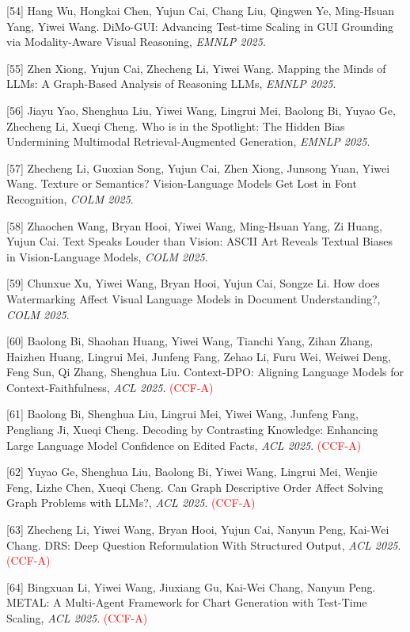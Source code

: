 [54] Hang Wu, Hongkai Chen, Yujun Cai, Chang Liu, Qingwen Ye, Ming-Hsuan Yang, Yiwei Wang. DiMo-GUI: Advancing Test-time Scaling in GUI Grounding via Modality-Aware Visual Reasoning, \textit{EMNLP 2025}.

[55] Zhen Xiong, Yujun Cai, Zhecheng Li, Yiwei Wang. Mapping the Minds of LLMs: A Graph-Based Analysis of Reasoning LLMs, \textit{EMNLP 2025}.

[56] Jiayu Yao, Shenghua Liu, Yiwei Wang, Lingrui Mei, Baolong Bi, Yuyao Ge, Zhecheng Li, Xueqi Cheng. Who is in the Spotlight: The Hidden Bias Undermining Multimodal Retrieval-Augmented Generation, \textit{EMNLP 2025}.

[57] Zhecheng Li, Guoxian Song, Yujun Cai, Zhen Xiong, Junsong Yuan, Yiwei Wang. Texture or Semantics? Vision-Language Models Get Lost in Font Recognition, \textit{COLM 2025}.

[58] Zhaochen Wang, Bryan Hooi, Yiwei Wang, Ming-Hsuan Yang, Zi Huang, Yujun Cai. Text Speaks Louder than Vision: ASCII Art Reveals Textual Biases in Vision-Language Models, \textit{COLM 2025}.

[59] Chunxue Xu, Yiwei Wang, Bryan Hooi, Yujun Cai, Songze Li. How does Watermarking Affect Visual Language Models in Document Understanding?, \textit{COLM 2025}.

[60] Baolong Bi, Shaohan Huang, Yiwei Wang, Tianchi Yang, Zihan Zhang, Haizhen Huang, Lingrui Mei, Junfeng Fang, Zehao Li, Furu Wei, Weiwei Deng, Feng Sun, Qi Zhang, Shenghua Liu. Context-DPO: Aligning Language Models for Context-Faithfulness, \textit{ACL 2025}. \textcolor{red}{(CCF-A)}

[61] Baolong Bi, Shenghua Liu, Lingrui Mei, Yiwei Wang, Junfeng Fang, Pengliang Ji, Xueqi Cheng. Decoding by Contrasting Knowledge: Enhancing Large Language Model Confidence on Edited Facts, \textit{ACL 2025}. \textcolor{red}{(CCF-A)}

[62] Yuyao Ge, Shenghua Liu, Baolong Bi, Yiwei Wang, Lingrui Mei, Wenjie Feng, Lizhe Chen, Xueqi Cheng. Can Graph Descriptive Order Affect Solving Graph Problems with LLMs?, \textit{ACL 2025}. \textcolor{red}{(CCF-A)}

[63] Zhecheng Li, Yiwei Wang, Bryan Hooi, Yujun Cai, Nanyun Peng, Kai-Wei Chang. DRS: Deep Question Reformulation With Structured Output, \textit{ACL 2025}. \textcolor{red}{(CCF-A)}

[64] Bingxuan Li, Yiwei Wang, Jiuxiang Gu, Kai-Wei Chang, Nanyun Peng. METAL: A Multi-Agent Framework for Chart Generation with Test-Time Scaling, \textit{ACL 2025}. \textcolor{red}{(CCF-A)}

